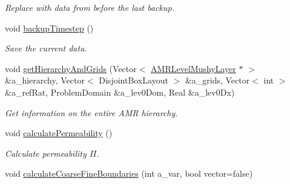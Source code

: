 \begin{DoxyCompactItemize}
\begin{DoxyCompactList}\small\item\em Replace with data from before the last backup. \end{DoxyCompactList}\item 
\hypertarget{class_a_m_r_level_mushy_layer_a165220ab8589f345f78556bf427e3745}{void \hyperlink{class_a_m_r_level_mushy_layer_a165220ab8589f345f78556bf427e3745}{backup\-Timestep} ()}\label{class_a_m_r_level_mushy_layer_a165220ab8589f345f78556bf427e3745}

\begin{DoxyCompactList}\small\item\em Save the current data. \end{DoxyCompactList}\item 
\hypertarget{class_a_m_r_level_mushy_layer_a2c8c30594b0753f915713ca0e701eb3a}{void \hyperlink{class_a_m_r_level_mushy_layer_a2c8c30594b0753f915713ca0e701eb3a}{get\-Hierarchy\-And\-Grids} (Vector$<$ \hyperlink{class_a_m_r_level_mushy_layer}{A\-M\-R\-Level\-Mushy\-Layer} $\ast$ $>$ \&a\-\_\-hierarchy, Vector$<$ Disjoint\-Box\-Layout $>$ \&a\-\_\-grids, Vector$<$ int $>$ \&a\-\_\-ref\-Rat, Problem\-Domain \&a\-\_\-lev0\-Dom, Real \&a\-\_\-lev0\-Dx)}\label{class_a_m_r_level_mushy_layer_a2c8c30594b0753f915713ca0e701eb3a}

\begin{DoxyCompactList}\small\item\em Get information on the entire A\-M\-R hierarchy. \end{DoxyCompactList}\item 
\hypertarget{class_a_m_r_level_mushy_layer_aef9f77f57da892bd8930943bfbec9a6b}{void \hyperlink{class_a_m_r_level_mushy_layer_aef9f77f57da892bd8930943bfbec9a6b}{calculate\-Permeability} ()}\label{class_a_m_r_level_mushy_layer_aef9f77f57da892bd8930943bfbec9a6b}

\begin{DoxyCompactList}\small\item\em Calculate permeability $ \Pi $. \end{DoxyCompactList}\item 
\hypertarget{class_a_m_r_level_mushy_layer_a3b0111c15c91c012d328e42b43fa954f}{void \hyperlink{class_a_m_r_level_mushy_layer_a3b0111c15c91c012d328e42b43fa954f}{calculate\-Coarse\-Fine\-Boundaries} (int a\-\_\-var, bool vector=false)}\label{class_a_m_r_level_mushy_layer_a3b0111c15c91c012d328e42b43fa954f}


\end{DoxyCompactItemize}
